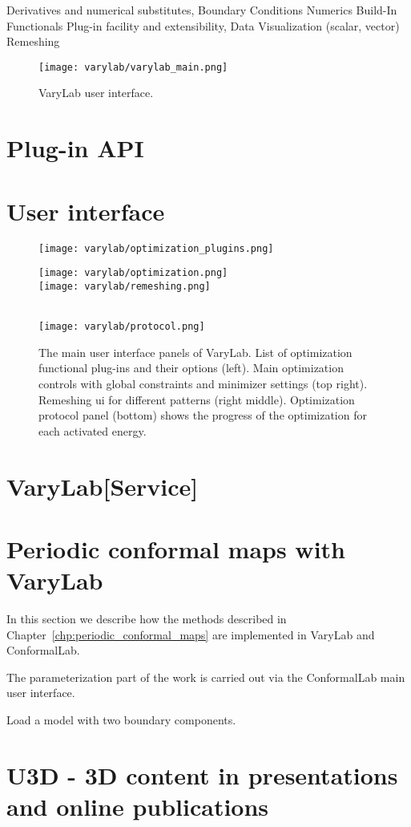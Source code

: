 \documentclass[Thesis.tex]{subfiles}
\begin{document}
Derivatives and numerical substitutes, 
Boundary Conditions
Numerics
Build-In Functionals
Plug-in facility and extensibility, 
Data Visualization (scalar, vector)
Remeshing

\begin{figure}
\begin{center}
\texttt{[image: varylab/varylab\_main.png]}
\caption{{\sc VaryLab} user interface.}
\label{fig:varylab_main_ui}
\end{center}
\end{figure}

\section{Plug-in API}
\label{sec:plugin-api}

\section{User interface}



\begin{figure}
\begin{center}
\texttt{[image: varylab/optimization\_plugins.png]}\hfill
\begin{minipage}[b]{0.47\linewidth}
\texttt{[image: varylab/optimization.png]}\\
\texttt{[image: varylab/remeshing.png]}
\end{minipage}\\
\vskip 0.05cm
\texttt{[image: varylab/protocol.png]}
\caption{The main user interface panels of {\sc VaryLab}. List of optimization functional plug-ins and their options (left). Main optimization controls with global constraints and minimizer settings (top right). Remeshing ui for different patterns (right middle). Optimization protocol panel (bottom) shows the progress of the optimization for each activated energy.}
\label{default}
\end{center}
\end{figure}



\section{{\sc VaryLab[Service]}}


\section{Periodic conformal maps with {\sc VaryLab}}
In this section we describe how the methods described in Chapter~\ref{chp:periodic_conformal_maps} are implemented in {\sc VaryLab} and {\sc ConformalLab}. 

The parameterization part of the work is carried out via the {\sc ConformalLab} main user interface. 

Load a model with two boundary components. 

\section{{\sc U3D} - 3D content in presentations and online publications}
\label{sec:u3d}

\subfilebibliography
\end{document}
